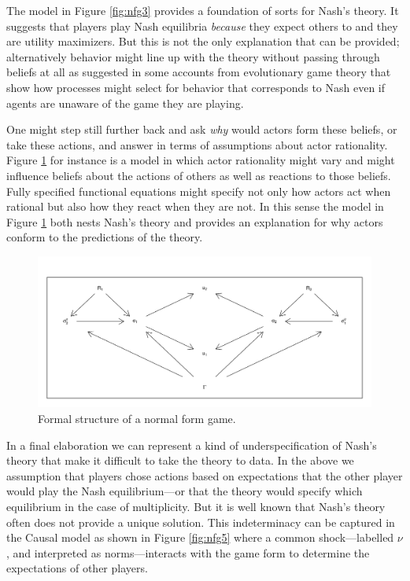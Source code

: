 \documentclass[
  12pt,
]{book}
\begin{document}
The model in Figure \ref{fig:nfg3} provides a foundation of sorts for Nash's theory. It suggests that players play Nash equilibria \emph{because} they expect others to and they are utility maximizers. But this is not the only explanation that can be provided; alternatively behavior might line up with the theory without passing through beliefs at all as suggested in some accounts from evolutionary game theory that show how processes might select for behavior that corresponds to Nash even if agents are unaware of the game they are playing.

One might step still further back and ask \emph{why} would actors form these beliefs, or take these actions, and answer in terms of assumptions about actor rationality. Figure \ref{fig:nfg4} for instance is a model in which actor rationality might vary and might influence beliefs about the actions of others as well as reactions to those beliefs. Fully specified functional equations might specify not only how actors act when rational but also how they react when they are not. In this sense the model in Figure \ref{fig:nfg4} both nests Nash's theory and provides an explanation for why actors conform to the predictions of the theory.

\begin{figure}

{\centering \includegraphics[width=0.8\linewidth]{ii_files/figure-latex/nfg4-1} 

}

\caption{Formal structure of a normal form game.}\label{fig:nfg4}
\end{figure}

In a final elaboration we can represent a kind of underspecification of Nash's theory that make it difficult to take the theory to data. In the above we assumption that players chose actions based on expectations that the other player would play the Nash equilibrium---or that the theory would specify which equilibrium in the case of multiplicity. But it is well known that Nash's theory often does not provide a unique solution. This indeterminacy can be captured in the Causal model as shown in Figure \ref{fig:nfg5} where a common shock---labelled \(\nu\), and interpreted as norms---interacts with the game form to determine the expectations of other players.
\end{document}
